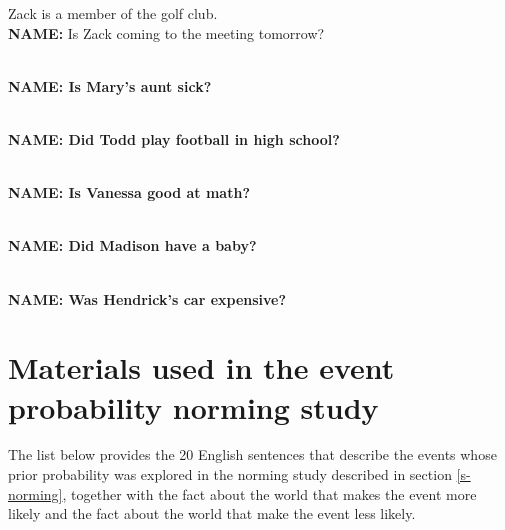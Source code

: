 \documentclass[11pt,fleqn]{article}
\newcommand{\6}{\mbox{$[\hspace*{-.6mm}[$}}
\newcommand{\9}{\mbox{$]\hspace*{-.6mm}]$}}
\begin{document}
\begin{exe}
\ex\label{control2-complete}
\begin{xlist}

 Zack is a member of the golf club.
\\ {\bf NAME:} Is Zack coming to the meeting tomorrow?

\\ {\bf NAME: Is Mary's aunt sick?} 

\\ {\bf NAME: Did Todd play football in high school?} 

\\ {\bf NAME: Is Vanessa good at math?} 

\\ {\bf NAME: Did Madison have a baby?} 

\\ {\bf NAME: Was Hendrick's car expensive?} 

\end{xlist}
\end{exe}

\section{Materials used in the event probability norming study}\label{a-exp1}

The list below provides the 20 English sentences that describe the events whose prior probability was explored in the norming study described in section \ref{s-norming}, together with the fact about the world that makes the event more likely and the fact about the world that make the event less likely.
\end{document}
